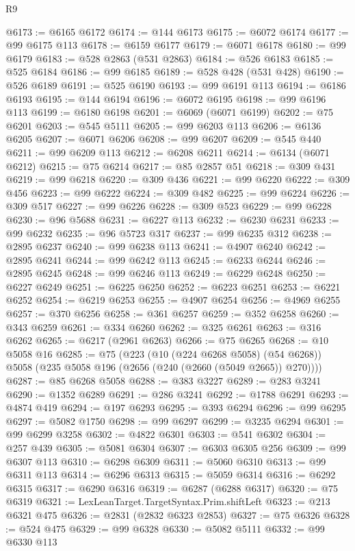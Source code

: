 \begin{lexlean}{R9}
\begin{coremodule}
{{{{{{{{{{{{{{{{{{{{{{{{{{{{{{{{{{{{{{{{{{{{{{{{{{{{{{{{{{{{{{{{{{{{{{{{{{{{{{{{{{{{@6173 := @6165 @6172
@6174 := @144 @6173
@6175 := @6072 @6174
@6177 := @99 @6175 @113
@6178 := @6159 @6177
@6179 := @6071 @6178
@6180 := @99 @6179
@6183 := @528 @2863 (@531 @2863)
@6184 := @526 @6183
@6185 := @525 @6184
@6186 := @99 @6185
@6189 := @528 @428 (@531 @428)
@6190 := @526 @6189
@6191 := @525 @6190
@6193 := @99 @6191 @113
@6194 := @6186 @6193
@6195 := @144 @6194
@6196 := @6072 @6195
@6198 := @99 @6196 @113
@6199 := @6180 @6198
@6201 := @6069 (@6071 @6199)
@6202 := @75 @6201
@6203 := @545 @5111
@6205 := @99 @6203 @113
@6206 := @6136 @6205
@6207 := @6071 @6206
@6208 := @99 @6207
@6209 := @545 @440
@6211 := @99 @6209 @113
@6212 := @6208 @6211
@6214 := @6134 (@6071 @6212)
@6215 := @75 @6214
@6217 := @85 @2857 @51
@6218 := @309 @431
@6219 := @99 @6218
@6220 := @309 @436
@6221 := @99 @6220
@6222 := @309 @456
@6223 := @99 @6222
@6224 := @309 @482
@6225 := @99 @6224
@6226 := @309 @517
@6227 := @99 @6226
@6228 := @309 @523
@6229 := @99 @6228
@6230 := @96 @5688
@6231 := @6227 @113
@6232 := @6230 @6231
@6233 := @99 @6232
@6235 := @96 @5723 @317
@6237 := @99 @6235 @312
@6238 := @2895 @6237
@6240 := @99 @6238 @113
@6241 := @4907 @6240
@6242 := @2895 @6241
@6244 := @99 @6242 @113
@6245 := @6233 @6244
@6246 := @2895 @6245
@6248 := @99 @6246 @113
@6249 := @6229 @6248
@6250 := @6227 @6249
@6251 := @6225 @6250
@6252 := @6223 @6251
@6253 := @6221 @6252
@6254 := @6219 @6253
@6255 := @4907 @6254
@6256 := @4969 @6255
@6257 := @370 @6256
@6258 := @361 @6257
@6259 := @352 @6258
@6260 := @343 @6259
@6261 := @334 @6260
@6262 := @325 @6261
@6263 := @316 @6262
@6265 := @6217 (@2961 @6263)
@6266 := @75 @6265
@6268 := @10 @5058 @16
@6285 := @75
    (@223
      (@10 (@224 @6268 @5058) (@54 @6268))
      @5058
      (@235 @5058 @196 (@2656 (@240 (@2660 (@5049 @2665)) @270))))
@6287 := @85 @6268 @5058
@6288 := @383 @3227
@6289 := @283 @3241
@6290 := @1352 @6289
@6291 := @286 @3241
@6292 := @1788 @6291
@6293 := @4874 @419
@6294 := @197 @6293
@6295 := @393 @6294
@6296 := @99 @6295
@6297 := @5082 @1750
@6298 := @99 @6297
@6299 := @3235 @6294
@6301 := @99 @6299 @3258
@6302 := @4822 @6301
@6303 := @541 @6302
@6304 := @257 @439
@6305 := @5081 @6304
@6307 := @6303 @6305 @256
@6309 := @99 @6307 @113
@6310 := @6298 @6309
@6311 := @5060 @6310
@6313 := @99 @6311 @113
@6314 := @6296 @6313
@6315 := @5059 @6314
@6316 := @6292 @6315
@6317 := @6290 @6316
@6319 := @6287 (@6288 @6317)
@6320 := @75 @6319
@6321 := LexLeanTarget.TargetSyntax.Prim.shiftLeft
@6323 := @213 @6321 @475
@6326 := @2831 (@2832 @6323 @2853)
@6327 := @75 @6326
@6328 := @524 @475
@6329 := @99 @6328
@6330 := @5082 @5111
@6332 := @99 @6330 @113
}}}}}}}}}}}}}}}}}}}}}}}}}}}}}}}}}}}}}}}}}}}}}}}}}}}}}}}}}}}}}}}}}}}}}}}}}}}}}}}}}}}}
\end{coremodule}
\end{lexlean}
